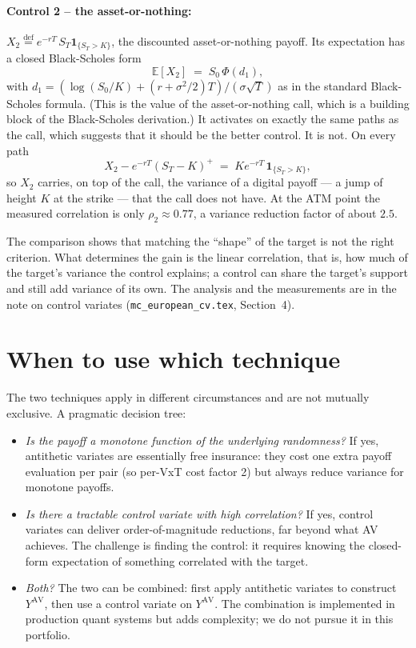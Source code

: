 \documentclass[11pt,a4paper]{article}
\theoremstyle{plain}
\theoremstyle{definition}
\theoremstyle{remark}
\newcommand{\E}{\mathbb{E}}
\newcommand{\eqdef}{\overset{\mathrm{def}}{=}}
\newcommand{\indic}{\mathbf{1}}
\begin{document}
\paragraph{Control 2 -- the asset-or-nothing:} $X_2 \eqdef e^{-rT}\,
S_T \indic_{\{S_T > K\}}$, the discounted asset-or-nothing payoff.
Its expectation has a closed Black-Scholes form
\begin{equation}
\E[X_2] \;=\; S_0\, \Phi(d_1),
\end{equation}
with $d_1 = (\log(S_0/K) + (r + \sigma^2/2)T) / (\sigma \sqrt T)$ as
in the standard Black-Scholes formula. (This is the value of the
asset-or-nothing call, which is a building block of the
Black-Scholes derivation.) It activates on exactly the same paths as
the call, which suggests that it should be the better control. It is
not. On every path
\begin{equation}
X_2 - e^{-rT}(S_T - K)^+ \;=\; K e^{-rT}\, \indic_{\{S_T > K\}},
\end{equation}
so $X_2$ carries, on top of the call, the variance of a digital payoff
--- a jump of height $K$ at the strike --- that the call does not
have. At the ATM point the measured correlation is only
$\rho_2 \approx 0.77$, a variance reduction factor of about $2.5$.

The comparison shows that matching the ``shape'' of the target is
not the right criterion. What determines the gain is the linear
correlation, that is, how much of the target's variance the control
explains; a control can share the target's support and still add
variance of its own. The analysis and the measurements are in the
note on control variates (\texttt{mc\_european\_cv.tex},
Section~4).

\section{When to use which technique}
\label{sec:when}

The two techniques apply in different circumstances and are not
mutually exclusive. A pragmatic decision tree:

\begin{itemize}
\item \emph{Is the payoff a monotone function of the underlying
randomness?} If yes, antithetic variates are essentially free
insurance: they cost one extra payoff evaluation per pair (so per-VxT
cost factor 2) but always reduce variance for monotone payoffs.

\item \emph{Is there a tractable control variate with high
correlation?} If yes, control variates can deliver order-of-magnitude
reductions, far beyond what AV achieves. The challenge is finding
the control: it requires knowing the closed-form expectation of
something correlated with the target.

\item \emph{Both?} The two can be combined: first apply antithetic
variates to construct $Y^{\mathrm{AV}}$, then use a control variate
on $Y^{\mathrm{AV}}$. The combination is implemented in production
quant systems but adds complexity; we do not pursue it in this
portfolio.
\end{itemize}
\end{document}
